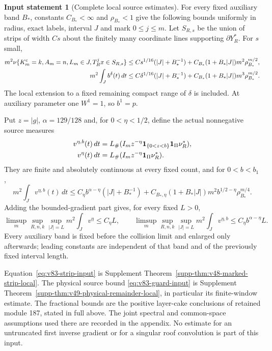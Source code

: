 \documentclass[11pt,reqno]{amsart}
\numberwithin{equation}{section}
\theoremstyle{definition}
\newtheorem{inputstatement}[theorem]{Input statement}
\theoremstyle{remark}\newtheorem{remark}[theorem]{Remark}
\newcommand{\one}{\mathbf1}\newcommand{\dd}{\,\mathrm d}
\begin{document}
\begin{inputstatement}[Complete local source estimates]
\label{input:v83-local}
For every fixed auxiliary band $B_*$, constants $C_{B_*}<\infty$ and
$\rho_{B_*}<1$ give the following bounds uniformly in radius, exact
labels, interval $J$ and mark $0\le j\le m$. Let $S_{R,s}$ be the
union of strips of width $Cs$ about the finitely many coordinate lines
supporting $\partial Y_R^*$. For $s$ small,
\begin{align}
 m^2\nu\{K_m^{\rm c}=k,A_m=n,L_m\in J,
                       T_R^jx\in S_{R,s}\}
 &\le Cs^{1/16}(|J|+B_*^{-1})
   +C_{B_*}(1+B_*|J|)m^2\rho_{B_*}^{m/2},\label{eq:v83-strip-input}\\
 m^2\int_Jb^\delta(t)\,dt
 &\le C\delta^{1/16}(|J|+B_*^{-1})
   +C_{B_*}(1+B_*|J|)m^3\rho_{B_*}^{m/2}.\label{eq:v83-guard-input}
\end{align}
The local extension to a fixed remaining compact range of $\delta$
is included. At auxiliary parameter one $W^1=1$, so $b^1=p$.

Put $z=|g|$, $\alpha=129/128$ and, for $0<\eta<1/2$, define the
actual nonnegative source measures
\begin{align}
 v^{\eta,b}(t)\,dt&=L_\#(I_m z^{-\eta}\one_{\{0<z<b\}}
                                       \one_\Pi\nu_R^*),\notag\\
 v^\eta(t)\,dt&=L_\#(I_m z^{-\eta}\one_\Pi\nu_R^*).
                                                   \label{eq:v83-fractional-input}
\end{align}
They are finite and absolutely continuous at every fixed count, and
for $0<b<b_1$,
\begin{equation}\label{eq:v83-fractional-finite-input}
 m^2\int_Jv^{\eta,b}(t)\,dt
 \le C_\eta b^{\alpha-\eta}(|J|+B_*^{-1})
  +C_{B_*,\eta}(1+B_*|J|)m^2b^{1/2-\eta}\rho_{B_*}^{m/4}.
\end{equation}
Adding the bounded-gradient part gives, for every fixed $L>0$,
\begin{equation}\label{eq:v83-fixed-width-input}
 \limsup_m\sup_{R,n,k}\sup_{|J|=L}m^2\int_Jv^\eta\le C_\eta L,
 \qquad
 \limsup_m\sup_{R,n,k}\sup_{|J|=L}m^2\int_Jv^{\eta,b}
                                      \le C_\eta b^{\alpha-\eta}L.
\end{equation}
Every auxiliary band is fixed before the collision limit and enlarged
only afterwards; leading constants are independent of that band and
of the previously fixed interval length.
\end{inputstatement}
Equation~\eqref{eq:v83-strip-input} is Supplement
Theorem~\ref{supp-thm:v48-marked-strip-local}. The physical source
bound \eqref{eq:v83-guard-input} is Supplement
Theorem~\ref{supp-thm:v49-physical-remainder-local}, in particular its
finite-window estimate. The fractional bounds are the positive
layer-cake conclusions of retained module 187, stated in full above.
The joint spectral and common-space assumptions used there are recorded
in the appendix. No estimate for an untruncated first inverse gradient
or for a singular roof convolution is part of this input.
\end{document}

